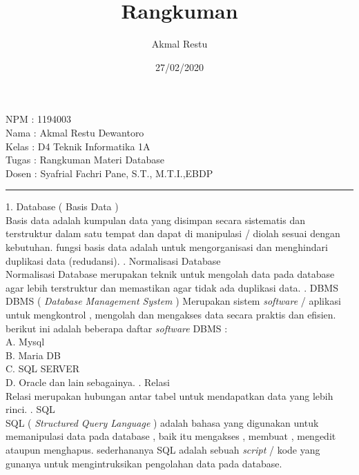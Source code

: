 \documentclass[12pt]{book}
\title{Rangkuman}
\author{Akmal Restu}
\date{27/02/2020}
\begin{document}
\begin{flushleft}
NPM		: 1194003\\
Nama  	: Akmal Restu Dewantoro\\
Kelas 	: D4 Teknik Informatika 1A\\
Tugas	: Rangkuman Materi Database\\
Dosen	: Syafrial Fachri Pane, S.T., M.T.I.,EBDP
\end{flushleft}
\hrule
\begin{flushleft}
	
1. Database ( Basis Data )\\
   Basis data adalah kumpulan data yang disimpan secara sistematis dan terstruktur dalam satu tempat dan dapat di manipulasi / diolah sesuai dengan kebutuhan. fungsi basis data adalah untuk mengorganisasi dan menghindari duplikasi data (redudansi).
   \newline {}. Normalisasi Database\\
   Normalisasi Database merupakan teknik untuk mengolah data pada database agar lebih terstruktur dan memastikan agar tidak ada duplikasi data.
   \newline {}. DBMS\\
   DBMS ( \textit{Database Management System} ) Merupakan sistem \textit{software} / aplikasi untuk mengkontrol , mengolah dan mengakses data secara praktis dan efisien. berikut ini adalah beberapa daftar \textit{software} DBMS : \\
   	A. Mysql\\
	B. Maria DB\\
	C. SQL SERVER\\
	D. Oracle dan lain sebagainya.
   \newline {}. Relasi\\
   Relasi merupakan hubungan antar tabel untuk mendapatkan data yang lebih rinci.
   \newline {}. SQL\\
   SQL ( \textit{Structured Query Language} ) adalah bahasa yang digunakan untuk memanipulasi data pada database , baik itu mengakses , membuat , mengedit ataupun menghapus. sederhananya SQL adalah sebuah \textit{script} / kode yang gunanya untuk mengintruksikan pengolahan data pada database.
   
\end{flushleft}
\end{document}
